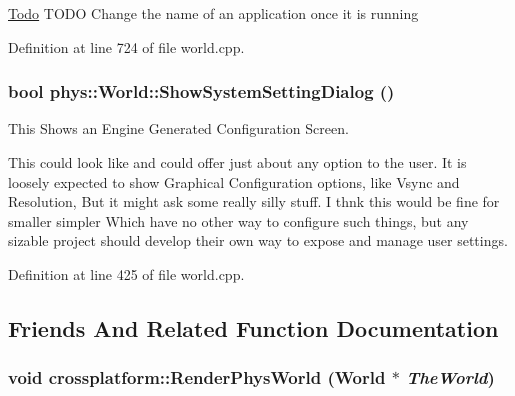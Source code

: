 \begin{Desc}
\item[\hyperlink{todo__todo000019}{Todo}]TODO Change the name of an application once it is running \end{Desc}




Definition at line 724 of file world.cpp.

\hypertarget{classphys_1_1World_a0d8ce136bebe81a6826b7e202a531f6a}{
\subsubsection[{ShowSystemSettingDialog}]{\setlength{\rightskip}{0pt plus 5cm}bool phys::World::ShowSystemSettingDialog ()}}
\label{da/ddf/classphys_1_1World_a0d8ce136bebe81a6826b7e202a531f6a}


This Shows an Engine Generated Configuration Screen. 

This could look like and could offer just about any option to the user. It is loosely expected to show Graphical Configuration options, like Vsync and Resolution, But it might ask some really silly stuff. I thnk this would be fine for smaller simpler Which have no other way to configure such things, but any sizable project should develop their own way to expose and manage user settings. 

Definition at line 425 of file world.cpp.



\subsection{Friends And Related Function Documentation}
\hypertarget{classphys_1_1World_ac7946bdb41c7884bcd7cfdec2b5358f0}{
\subsubsection[{crossplatform::RenderPhysWorld}]{\setlength{\rightskip}{0pt plus 5cm}void crossplatform::RenderPhysWorld ({\bf World} $\ast$ {\em TheWorld})}}
\label{da/ddf/classphys_1_1World_ac7946bdb41c7884bcd7cfdec2b5358f0}


